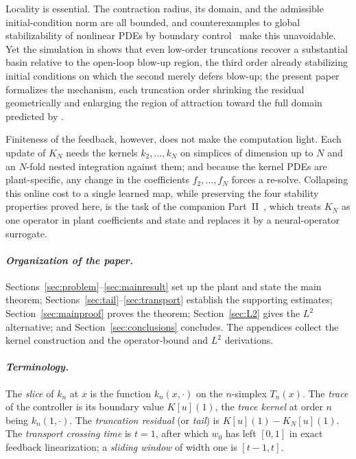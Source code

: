 \documentclass[amsthm]{autart}
\theoremstyle{plain}
\theoremstyle{definition}
\newcommand{\Ltwo}{L^2}
\begin{document}
Locality is essential. The contraction radius, its domain, and the admissible initial-condition norm are all bounded, and counterexamples to global stabilizability of nonlinear PDEs by boundary control~\cite{vazquez2008volterra1,vazquez2008volterra2} make this unavoidable. Yet the simulation in \cite{krstic2026feedbacklinearizationhyperbolicpdes} shows that even low-order truncations recover a substantial basin relative to the open-loop blow-up region, the third order already stabilizing initial conditions on which the second merely defers blow-up; the present paper formalizes the mechanism, each truncation order shrinking the residual geometrically and enlarging the region of attraction toward the full domain predicted by \cite{krstic2026feedbacklinearizationhyperbolicpdes}.

Finiteness of the feedback, however, does not make the computation light. Each update of $K_N$ needs the kernels $k_2, \ldots, k_N$ on simplices of dimension up to $N$ and an $N$-fold nested integration against them; and because the kernel PDEs are plant-specific, any change in the coefficients $f_2, \ldots, f_N$ forces a re-solve. Collapsing this online cost to a single learned map, while preserving the four stability properties proved here, is the task of the companion Part~II~\cite{krstic2026feedbacklinearizationhyperbolicpdes-NO}, which treats $K_N$ as one operator in plant coefficients and state and replaces it by a neural-operator surrogate.

\paragraph*{\normalfont\em Organization of the paper.}
Sections~\ref{sec:problem}--\ref{sec:mainresult} set up the plant and state the main theorem; Sections~\ref{sec:tail}--\ref{sec:transport} establish the supporting estimates; Section~\ref{sec:mainproof} proves the theorem; Section~\ref{sec:L2} gives the $\Ltwo$ alternative; and Section~\ref{sec:conclusions} concludes. The appendices collect the kernel construction and the operator-bound and $\Ltwo$ derivations.

\paragraph*{\normalfont\em Terminology.}
The \emph{slice} of $k_n$ at $x$ is the function $k_n(x,\cdot)$ on the $n$-simplex $T_n(x)$. The \emph{trace} of the controller is its boundary value $K[u](1)$, the \emph{trace kernel} at order $n$ being $k_n(1,\cdot)$. The \emph{truncation residual} (or \emph{tail}) is $K[u](1) - K_N[u](1)$. The \emph{transport crossing time} is $t = 1$, after which $w_0$ has left $[0,1]$ in exact feedback linearization; a \emph{sliding window} of width one is $[t-1, t]$.
\end{document}
